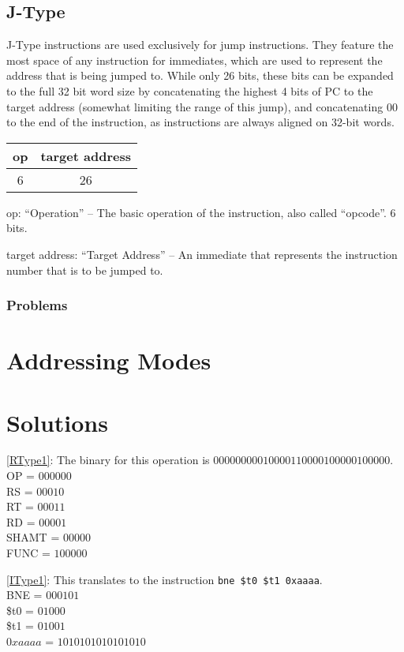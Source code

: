 \documentclass{article}
\begin{document}
\subsection{J-Type}\label{JType}

J-Type instructions are used exclusively for jump instructions. They feature the most space of any instruction for immediates, which are used to represent the address that is being jumped to. While only 26 bits, these bits can be expanded to the full 32 bit word size by concatenating the highest 4 bits of PC to the target address (somewhat limiting the range of this jump), and concatenating 00 to the end of the instruction, as instructions are always aligned on 32-bit words. 

\begin{tabular}{| c | c |}
    \hline
        op & target address \\
        \hline
        6 & 26 \\
    \hline
\end{tabular}

op: ``Operation'' -- The basic operation of the instruction, also called ``opcode''. 6 bits.

target address: ``Target Address'' -- An immediate that represents the instruction number that is to be jumped to. 

\subsubsection{Problems}\label{JTypeProblems}



\section{Addressing Modes}\label{Addressing}

\section{Solutions}

\ref{RType1}: The binary for this operation is $000000 00010 00011 00001 00000 100000$. \\ OP = $000000$ \\ RS = $00010$ \\ RT = $00011$ \\ RD = $00001$ \\ SHAMT = $00000$ \\ FUNC = $100000$

\ref{IType1}: This translates to the instruction \texttt{bne \$t0 \$t1 0xaaaa}. \\ BNE = $000101$ \\ \$t0 = $01000$ \\ \$t1 = $01001$ \\ $0xaaaa$ = $1010101010101010$

\printindex
\end{document}
